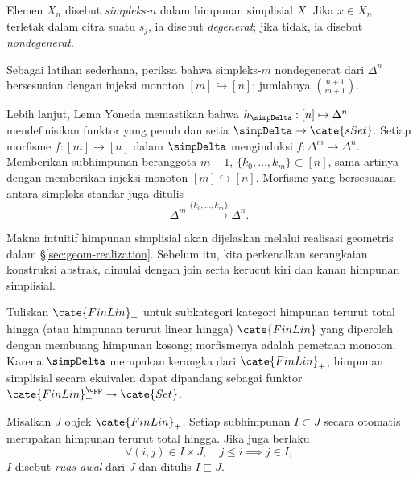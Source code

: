 \begin{definition}\label{def:simplex}
	Elemen $X_n$ disebut \emph{simpleks-$n$} dalam himpunan simplisial $X$.
	Jika $x\in X_n$ terletak dalam citra suatu $s_j$, ia disebut
	\emph{degenerat}; jika tidak, ia disebut \emph{nondegenerat}.
\end{definition}

Sebagai latihan sederhana, periksa bahwa simpleks-$m$
nondegenerat dari $\Delta^n$ bersesuaian dengan injeksi monoton
$[m]\hookrightarrow[n]$; jumlahnya $\binom{n+1}{m+1}$.

Lebih lanjut, Lema Yoneda memastikan bahwa
$h_{\simpDelta}:[n]\mapsto\Delta^n$ mendefinisikan funktor yang penuh dan setia
$\simpDelta\to\cate{sSet}$. Setiap morfisme $f:[m]\to[n]$ dalam
$\simpDelta$ menginduksi $f:\Delta^m\to\Delta^n$. Memberikan subhimpunan
beranggota $m+1$, $\{k_0,\ldots,k_m\}\subset[n]$, sama artinya dengan
memberikan injeksi monoton $[m]\hookrightarrow[n]$. Morfisme yang
bersesuaian antara simpleks standar juga ditulis
\[ \Delta^m \xrightarrow{\{k_0, \ldots, k_m\}} \Delta^n . \]

Makna intuitif himpunan simplisial akan dijelaskan melalui realisasi
geometris dalam \S\ref{sec:geom-realization}. Sebelum itu, kita perkenalkan
serangkaian konstruksi abstrak, dimulai dengan join serta kerucut kiri dan
kanan himpunan simplisial.

Tuliskan $\cate{FinLin}_+$ untuk subkategori kategori himpunan terurut
total hingga (atau himpunan terurut linear hingga) $\cate{FinLin}$ yang
diperoleh dengan membuang himpunan kosong; morfismenya adalah pemetaan
monoton. Karena $\simpDelta$ merupakan kerangka dari $\cate{FinLin}_+$,
himpunan simplisial secara ekuivalen dapat dipandang sebagai funktor
$\cate{FinLin}_+^{\opp}\to\cate{Set}$.

\begin{convention}
	Misalkan $J$ objek $\cate{FinLin}_+$. Setiap subhimpunan $I\subset J$
	secara otomatis merupakan himpunan terurut total hingga. Jika juga berlaku
	\[ \forall (i, j) \in I \times J, \quad j \leq i \implies j \in I, \]
	$I$ disebut \emph{ruas awal} dari $J$ dan ditulis $I\sqsubset J$.
\end{convention}


